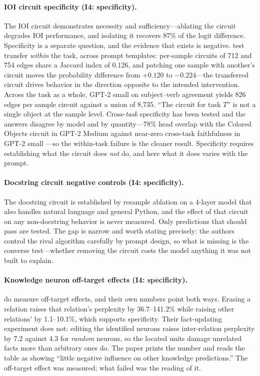 \documentclass{article}
\begin{document}
\paragraph{IOI circuit specificity (I4: specificity).}
The IOI circuit \citep{wang2023interpretability} demonstrates necessity and sufficiency---ablating the circuit degrades IOI performance, and isolating it recovers 87\% of the logit difference. Specificity is a separate question, and the evidence that exists is negative. \citet{wu2026demystifying} test transfer \emph{within} the task, across prompt templates: per-sample circuits of 712 and 754 edges share a Jaccard index of 0.126, and patching one sample with another's circuit moves the probability difference from $+0.120$ to $-0.224$---the transferred circuit drives behavior in the direction opposite to the intended intervention. Across the task as a whole, GPT-2 small on subject--verb agreement yields 826 edges per sample circuit against a union of 8{,}735. ``The circuit for task $T$'' is not a single object at the sample level. Cross-\emph{task} specificity has been tested and the answers disagree by model and by quantity---78\% head overlap with the Colored Objects circuit in GPT-2 Medium \citep{merullo2024circuit} against near-zero cross-task faithfulness in GPT-2 small \citep{hanna2024faith}---so the within-task failure is the cleaner result. Specificity requires establishing what the circuit does \emph{not} do, and here what it does varies with the prompt.

\paragraph{Docstring circuit negative controls (I4: specificity).}
The docstring circuit \citep{heimersheim2023docstring} is established by resample ablation on a 4-layer model that also handles natural language and general Python, and the effect of that circuit on any non-docstring behavior is never measured. Only predictions that should pass are tested. The gap is narrow and worth stating precisely: the authors control the rival algorithm carefully by prompt design, so what is missing is the converse test---whether removing the circuit costs the model anything it was not built to explain.

\paragraph{Knowledge neuron off-target effects (I4: specificity).}
\citet{dai2022knowledge} do measure off-target effects, and their own numbers point both ways. Erasing a relation raises that relation's perplexity by 36.7--141.2\% while raising other relations' by 1.1--10.1\%, which supports specificity. Their fact-updating experiment does not: editing the identified neurons raises inter-relation perplexity by 7.2 against 4.3 for \emph{random} neurons, so the located units damage unrelated facts more than arbitrary ones do. The paper prints the number and reads the table as showing ``little negative influence on other knowledge predictions.'' The off-target effect was measured; what failed was the reading of it.
\end{document}
